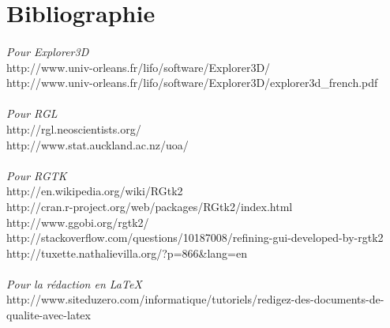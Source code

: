\section{Bibliographie} 
\paragraph{}
\textit{Pour Explorer3D}\\
http://www.univ-orleans.fr/lifo/software/Explorer3D/\\
http://www.univ-orleans.fr/lifo/software/Explorer3D/explorer3d\_french.pdf\\\\

\textit{Pour RGL}\\
http://rgl.neoscientists.org/\\
http://www.stat.auckland.ac.nz/uoa/\\\\

\textit{Pour RGTK}\\
http://en.wikipedia.org/wiki/RGtk2\\
http://cran.r-project.org/web/packages/RGtk2/index.html\\
http://www.ggobi.org/rgtk2/\\
http://stackoverflow.com/questions/10187008/refining-gui-developed-by-rgtk2\\
http://tuxette.nathalievilla.org/?p=866\&lang=en\\\\

\textit{Pour la rédaction en LaTeX}\\
http://www.siteduzero.com/informatique/tutoriels/redigez-des-documents-de-qualite-avec-latex\\